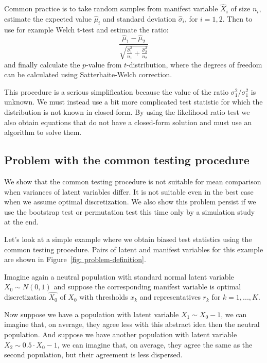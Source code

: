 \documentclass[10pt]{article}
\begin{document}
Common practice is to take random samples from manifest variable $\hat{X}_{i}$ of size $n_{i}$, estimate the expected value $\hat{\mu}_{i}$ and standard deviation $\hat{\sigma}_{i}$, for $i = 1, 2$. Then to use for example Welch t-test and estimate the ratio:
\begin{equation}
\frac{\hat{\mu}_{1} - \hat{\mu}_{2}}{
\sqrt{\frac{\hat{\sigma}^{2}_{1}}{n_{1}} + \frac{\hat{\sigma}^{2}_{2}}{n_{2}}}
}
\end{equation}
and finally calculate the $p$-value from $t$-distribution, where the degrees of freedom can be calculated using Satterhaite-Welch correction.

This procedure is a serious simplification because the value of the ratio $\sigma_{1}^{2} / \sigma_{1}^{2}$ is unknown. We must instead use a bit more complicated test statistic for which the distribution is not known in closed-form. By using the likelihood ratio test we also obtain equations that do not have a closed-form solution and must use an algorithm to solve them.


\subsection{Problem with the common testing procedure}

We show that the common testing procedure is not suitable for mean comparison when variances of latent variables differ. It is not suitable even in the best case when we assume optimal discretization. We also show this problem persist if we use the bootstrap test or permutation test this time only by a simulation study at the end.

Let's look at a simple example where we obtain biased test statistics using the common testing procedure. Pairs of latent and manifest variables for this example are shown in Figure~\ref{fig: problem-definition}.

Imagine again a neutral population with standard normal latent variable $X_{0} \sim N(0,1)$ and suppose the corresponding manifest variable is optimal discretization $\hat{X_{0}}$ of $X_{0}$ with thresholds $x_{k}$ and representatives $r_{k}$ for $k = 1, ..., K$.

Now suppose we have a population with latent variable $X_{1} \sim X_{0} - 1$, we can imagine that, on average, they agree less with this abstract idea then the neutral population. And suppose we have another population with latent variable $X_{2} \sim 0.5 \cdot X_{0} - 1$, we can imagine that, on average, they agree the same as the second population, but their agreement is less dispersed.
\end{document}

